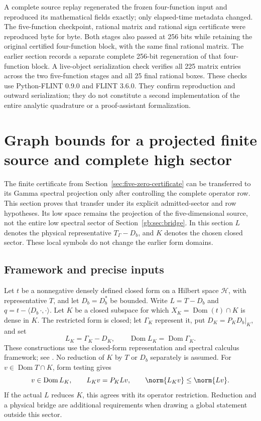 \documentclass[11pt,a4paper]{article}
\numberwithin{equation}{section}
\theoremstyle{definition}\newtheorem{definition}[theorem]{Definition}
\theoremstyle{remark}\newtheorem{remark}[theorem]{Remark}
\newcommand{\Hh}{\mathcal H}\newcommand{\Hw}{\mathcal H}
\begin{document}
A complete source replay regenerated the frozen four-function input and
reproduced its mathematical fields exactly; only elapsed-time metadata
changed. The five-function checkpoint, rational matrix and rational
sign certificate were reproduced byte for byte. Both stages also passed
at 256 bits while retaining the original certified four-function block,
with the same final rational matrix. The earlier section records a
separate complete 256-bit regeneration of that four-function block.
A live-object serialization check verifies all 225 matrix entries across
the two five-function stages and all 25 final rational boxes. These checks
use Python-FLINT 0.9.0 and FLINT 3.6.0. They confirm reproduction and
outward serialization; they do not constitute a second implementation of
the entire analytic quadrature or a proof-assistant formalization.

\section{Graph bounds for a projected finite source and complete high sector}
\label{gs:sec:transfer}
The finite certificate from Section~\ref{sec:five-zero-certificate} can be
transferred to its Gamma spectral projection only after controlling the
complete operator row. This section proves that transfer under its
explicit admitted-sector and row hypotheses. Its low space remains the
projection of the five-dimensional source, not the entire low spectral
sector of Section~\ref{gb:sec:bridge}. In this section $L$ denotes the
physical representative $T_\Gamma-D_b$, and $K$ denotes the chosen closed
sector. These local symbols do not change the earlier form domains.

\subsection{Framework and precise inputs}
Let $t$ be a nonnegative densely defined closed form on a Hilbert space
$\Hh$, with representative $T$, and let $D_b=D_b^*$ be bounded.
Write $L=T-D_b$ and $q=t-\langle D_b\,\cdot,\cdot\rangle$.
Let $K$ be a closed subspace for which $X_K=\operatorname{Dom}(t)\cap K$
is dense in $K$. The restricted form is closed; let $\Gamma_K$ represent
it, put $D_K=P_KD_b|_K$, and set
\[
 L_K=\Gamma_K-D_K,\qquad\operatorname{Dom}L_K=\operatorname{Dom}\Gamma_K.
\]
These constructions use the closed-form representation and spectral
calculus framework; see \cite[Sections 2.3, 3.1]{gbTeschl}.
No reduction of $K$ by $T$ or $D_b$ separately is assumed.
For $v\in\operatorname{Dom}T\cap K$, form testing gives
\begin{equation}\label{gs:eq:compression}
 v\in\operatorname{Dom}L_K,\qquad L_Kv=P_KLv,\qquad
 \norm{L_Kv}\le\norm{Lv}.
\end{equation}
If the actual $L$ reduces $K$, this agrees with its operator restriction.
Reduction and a physical bridge are additional requirements when drawing
a global statement outside this sector.
\end{document}
